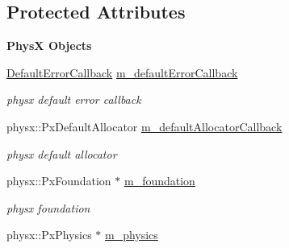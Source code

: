 \subsection*{Protected Attributes}
\begin{Indent}{\bf PhysX Objects}\par
{\em \label{_amgrp5dcec0622931609ebc9147725ef87cd9}
 }\begin{DoxyCompactItemize}
\item 
\hypertarget{classContent_1_1Physics_1_1PhysX_1_1Physics_afdcfc0be36d259db67361f3a1067b1af}{
\hyperlink{classDefaultErrorCallback}{DefaultErrorCallback} \hyperlink{classContent_1_1Physics_1_1PhysX_1_1Physics_afdcfc0be36d259db67361f3a1067b1af}{m\_\-defaultErrorCallback}}
\label{classContent_1_1Physics_1_1PhysX_1_1Physics_afdcfc0be36d259db67361f3a1067b1af}

\begin{DoxyCompactList}\small\item\em physx default error callback \item\end{DoxyCompactList}\item 
\hypertarget{classContent_1_1Physics_1_1PhysX_1_1Physics_aa21a34097ed6340119f852fae145bd2e}{
physx::PxDefaultAllocator \hyperlink{classContent_1_1Physics_1_1PhysX_1_1Physics_aa21a34097ed6340119f852fae145bd2e}{m\_\-defaultAllocatorCallback}}
\label{classContent_1_1Physics_1_1PhysX_1_1Physics_aa21a34097ed6340119f852fae145bd2e}

\begin{DoxyCompactList}\small\item\em physx default allocator \item\end{DoxyCompactList}\item 
\hypertarget{classContent_1_1Physics_1_1PhysX_1_1Physics_a86f47c7377c48ee1852010fb38479577}{
physx::PxFoundation $\ast$ \hyperlink{classContent_1_1Physics_1_1PhysX_1_1Physics_a86f47c7377c48ee1852010fb38479577}{m\_\-foundation}}
\label{classContent_1_1Physics_1_1PhysX_1_1Physics_a86f47c7377c48ee1852010fb38479577}

\begin{DoxyCompactList}\small\item\em physx foundation \item\end{DoxyCompactList}\item 
\hypertarget{classContent_1_1Physics_1_1PhysX_1_1Physics_a6424931f236d9a7633bf8ca9c39f2a17}{
physx::PxPhysics $\ast$ \hyperlink{classContent_1_1Physics_1_1PhysX_1_1Physics_a6424931f236d9a7633bf8ca9c39f2a17}{m\_\-physics}}
\label{classContent_1_1Physics_1_1PhysX_1_1Physics_a6424931f236d9a7633bf8ca9c39f2a17}


\end{DoxyCompactItemize}
\end{Indent}
